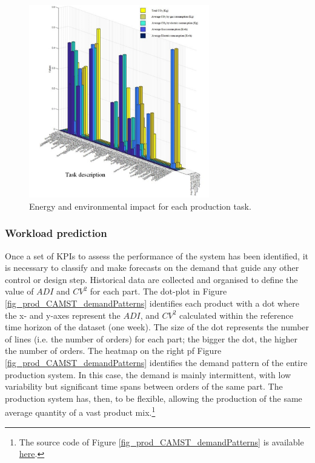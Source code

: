 \begin{figure}[hbt!]
\centering
\includegraphics[width=0.7\textwidth]{sectionProduction/control_figures/fig_prod_CAMST_performance2.png}
\captionsetup{type=figure}
\caption{Energy and environmental impact for each production task.}
\label{fig_prod_CAMST_performance2}
\end{figure}

\subsubsection{Workload prediction}
Once a set of KPIs to assess the performance of the system has been identified, it is necessary to classify and make forecasts on the demand that guide any other control or design step. Historical data are collected and organised to define the value of $ADI$ and $CV^2$ for each part. The dot-plot in Figure \ref{fig_prod_CAMST_demandPatterns} identifies each product with a dot where the x- and y-axes represent the $ADI$, and $CV^2$ calculated within the reference time horizon of the dataset (one week). The size of the dot represents the number of lines (i.e. the number of orders) for each part; the bigger the dot, the higher the number of orders. The heatmap on the right pf Figure \ref{fig_prod_CAMST_demandPatterns} identifies the demand pattern of the entire production system. In this case, the demand is mainly intermittent, with low variability but significant time spans between orders of the same part. The production system has, then, to be flexible, allowing the production of the same average quantity of a vast product mix.\footnote{The source code of Figure \ref{fig_prod_CAMST_demandPatterns} is available \href{https://github.com/aletuf93/logproj/blob/master/examples/PROD_02\%20Demand\%20patterns.ipynb}{here}.}

